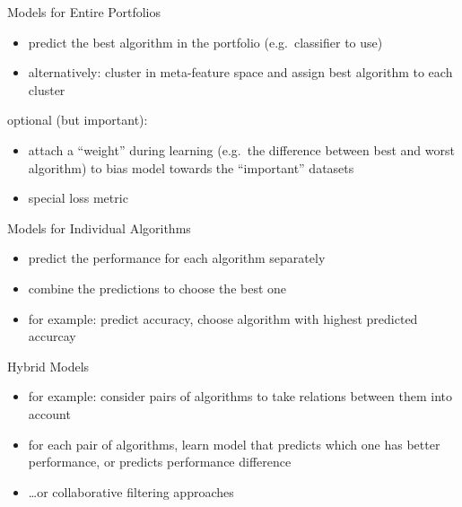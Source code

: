 \begin{frame}[c]{Models for Entire Portfolios}
\begin{itemize}
    \item predict the best algorithm in the portfolio (e.g.\ classifier to use)
\item alternatively: cluster in meta-feature space and assign best algorithm to
    each cluster
\end{itemize}
optional (but important):
\begin{itemize}
\item attach a ``weight'' during learning (e.g.\ the difference between best
    and worst algorithm) to bias model towards the ``important'' datasets
\item special loss metric
\end{itemize}
\end{frame}

\begin{frame}[c]{Models for Individual Algorithms}
\begin{itemize}
\item predict the performance for each algorithm separately
\item combine the predictions to choose the best one
\item for example: predict accuracy, choose algorithm with highest predicted
    accurcay
\end{itemize}
\end{frame}

\begin{frame}[c]{Hybrid Models}
\begin{itemize}
\item for example: consider pairs of algorithms to take relations between them into account
\item for each pair of algorithms, learn model that predicts which one has
    better performance, or predicts performance difference
\item \ldots{}or collaborative filtering approaches
\end{itemize}
\end{frame}

